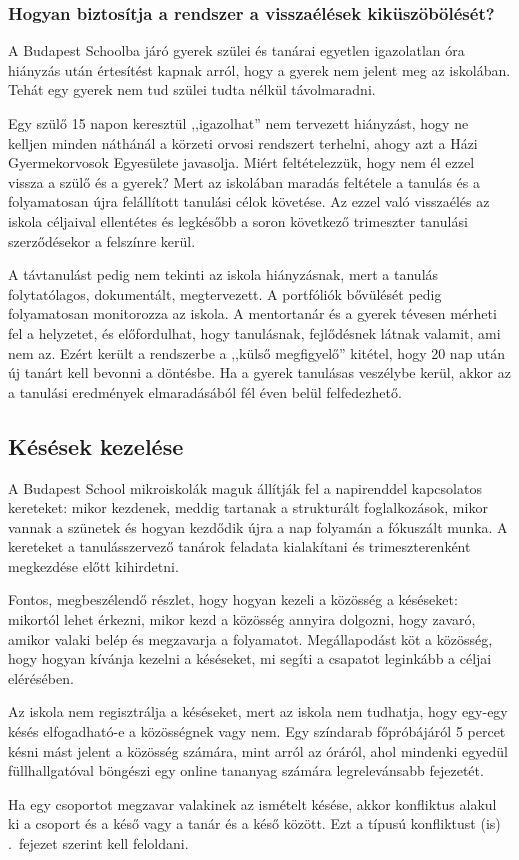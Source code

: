 \subsubsection{Hogyan biztosítja a rendszer a visszaélések kiküszöbölését?}
A Budapest Schoolba járó gyerek szülei és tanárai egyetlen igazolatlan óra hiányzás után értesítést kapnak arról, hogy a gyerek nem jelent meg az iskolában. Tehát egy gyerek nem tud szülei tudta nélkül távolmaradni.

Egy szülő 15 napon keresztül ,,igazolhat'' nem tervezett hiányzást, hogy ne kelljen minden náthánál a körzeti orvosi rendszert terhelni, ahogy azt a Házi Gyermekorvosok Egyesülete javasolja. Miért feltételezzük, hogy nem él ezzel vissza a szülő és a gyerek?  Mert az iskolában maradás feltétele a tanulás és a folyamatosan újra felállított tanulási célok követése. Az ezzel való visszaélés az iskola céljaival ellentétes és legkésőbb a soron következő trimeszter tanulási szerződésekor a felszínre kerül.

A távtanulást pedig nem tekinti az iskola hiányzásnak, mert a tanulás folytatólagos, dokumentált, megtervezett. A portfóliók bővülését pedig folyamatosan monitorozza az iskola. A mentortanár és a gyerek tévesen mérheti fel a helyzetet, és előfordulhat, hogy tanulásnak, fejlődésnek látnak valamit, ami nem az. Ezért került a rendszerbe a ,,külső megfigyelő'' kitétel, hogy 20 nap után új tanárt kell bevonni a döntésbe. Ha a gyerek tanulásas veszélybe kerül, akkor az a tanulási eredmények elmaradásából fél éven belül felfedezhető.

\subsection{Késések kezelése}
A Budapest School mikroiskolák maguk állítják fel a napirenddel kapcsolatos kereteket: mikor kezdenek, meddig tartanak a strukturált foglalkozások, mikor vannak a szünetek és hogyan kezdődik újra a nap folyamán a fóku\-szált munka. A kereteket a tanulásszervező tanárok feladata kialakítani és trimeszterenként megkezdése előtt kihirdetni.

Fontos, megbeszélendő részlet, hogy hogyan kezeli a közösség a késéseket: mikortól lehet érkezni, mikor kezd a közösség annyira dolgozni, hogy zavaró, amikor valaki belép és megzavarja a folyamatot. Megállapodást köt a közösség, hogy hogyan kívánja kezelni a késéseket, mi segíti a csapatot leginkább a céljai elérésében.

Az iskola nem regisztrálja a késéseket, mert az iskola nem tudhatja, hogy egy-egy késés elfogadható-e a közösségnek vagy nem. Egy színdarab főpróbájáról 5 percet késni mást jelent a közösség számára, mint arról az óráról, ahol mindenki egyedül füllhallgatóval böngészi egy online tananyag számára legrelevánsabb fejezetét.

Ha egy csoportot megzavar valakinek az ismételt késése, akkor konfliktus alakul ki a csoport és a késő vagy a tanár és a késő között. Ezt a típusú konfliktust (is) .~fejezet szerint kell feloldani.